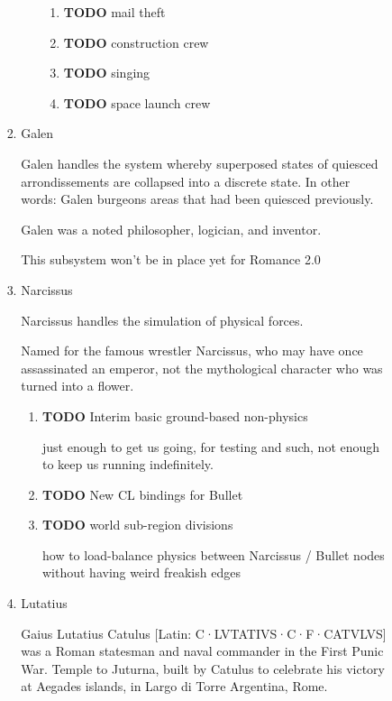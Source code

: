 \documentclass[11pt]{article}
\begin{document}
\begin{enumerate}
\begin{enumerate}
\begin{enumerate}
\begin{enumerate}
\begin{enumerate}
\begin{enumerate}
\item {\bfseries\sffamily TODO} mail theft
\label{sec-5-4-1-4-3-6-12-8}

\item {\bfseries\sffamily TODO} construction crew
\label{sec-5-4-1-4-3-6-12-9}

\item {\bfseries\sffamily TODO} singing
\label{sec-5-4-1-4-3-6-12-10}

\item {\bfseries\sffamily TODO} space launch crew
\label{sec-5-4-1-4-3-6-12-11}
\end{enumerate}
\end{enumerate}
\item Galen
\label{sec-5-4-1-4-3-7}

Galen handles the system whereby superposed states of quiesced
arrondissements are collapsed into a discrete state. In other
words: Galen burgeons areas that had been quiesced previously.

Galen was a noted philosopher, logician, and inventor.

This subsystem won't be in place yet for Romance 2.0 
\item Narcissus
\label{sec-5-4-1-4-3-8}

Narcissus handles the simulation of physical forces.

Named for the famous wrestler Narcissus, who may have once
assassinated an emperor, not the mythological character who was
turned into a flower.

\begin{enumerate}
\item {\bfseries\sffamily TODO} Interim basic ground-based non-physics
\label{sec-5-4-1-4-3-8-1}

just enough to get us going, for testing and such, not enough to keep
us running indefinitely.
\item {\bfseries\sffamily TODO} New CL bindings for Bullet
\label{sec-5-4-1-4-3-8-2}

\item {\bfseries\sffamily TODO} world sub-region divisions
\label{sec-5-4-1-4-3-8-3}

how to load-balance physics between Narcissus / Bullet nodes without
having weird freakish edges
\end{enumerate}
\item Lutatius
\label{sec-5-4-1-4-3-9}

Gaius Lutatius Catulus [Latin: C·LVTATIVS·C·F·CATVLVS] was a Roman
statesman and naval commander in the First Punic War.
Temple to Juturna, built by Catulus to celebrate his victory at
Aegades islands, in Largo di Torre Argentina, Rome.


\end{enumerate}
\end{enumerate}
\end{enumerate}
\end{enumerate}
\end{document}
